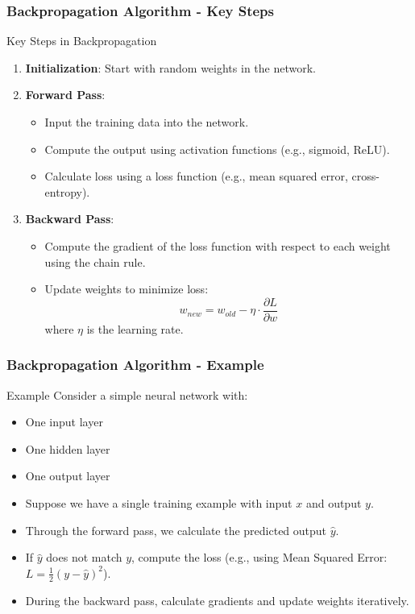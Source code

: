 \documentclass{beamer}
\begin{document}
\begin{frame}[fragile]
    \frametitle{Backpropagation Algorithm - Key Steps}
    \begin{block}{Key Steps in Backpropagation}
        \begin{enumerate}
            \item \textbf{Initialization}: Start with random weights in the network.
            \item \textbf{Forward Pass}:
            \begin{itemize}
                \item Input the training data into the network.
                \item Compute the output using activation functions (e.g., sigmoid, ReLU).
                \item Calculate loss using a loss function (e.g., mean squared error, cross-entropy).
            \end{itemize}
            \item \textbf{Backward Pass}:
            \begin{itemize}
                \item Compute the gradient of the loss function with respect to each weight using the chain rule.
                \item Update weights to minimize loss: 
                    \[
                    w_{new} = w_{old} - \eta \cdot \frac{\partial L}{\partial w}
                    \]
                    where \( \eta \) is the learning rate.
            \end{itemize}
        \end{enumerate}
    \end{block}
\end{frame}

\begin{frame}[fragile]
    \frametitle{Backpropagation Algorithm - Example}
    \begin{block}{Example}
        Consider a simple neural network with:
        \begin{itemize}
            \item One input layer
            \item One hidden layer
            \item One output layer
        \end{itemize}
        \begin{itemize}
            \item Suppose we have a single training example with input \(x\) and output \(y\).
            \item Through the forward pass, we calculate the predicted output \(\hat{y}\).
            \item If \(\hat{y}\) does not match \(y\), compute the loss (e.g., using Mean Squared Error: \(L = \frac{1}{2} (y - \hat{y})^2\)).
            \item During the backward pass, calculate gradients and update weights iteratively.
        \end{itemize}
    \end{block}
\end{frame}
\end{document}
